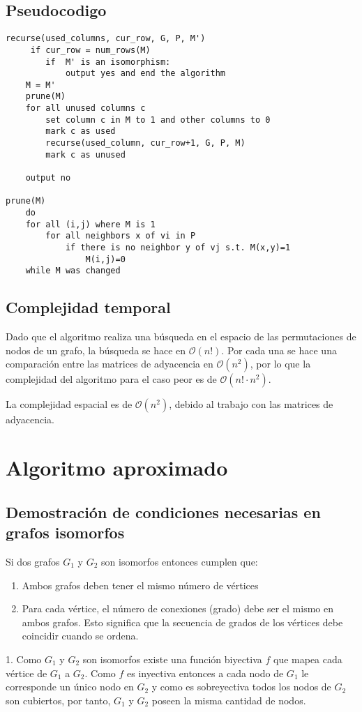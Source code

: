 \documentclass[12pt,a4paper]{article}
\begin{document}
\subsection{Pseudocodigo}
\begin{verbatim}
recurse(used_columns, cur_row, G, P, M')
     if cur_row = num_rows(M)
        if  M' is an isomorphism:
            output yes and end the algorithm
    M = M'
    prune(M) 
    for all unused columns c
        set column c in M to 1 and other columns to 0
        mark c as used
        recurse(used_column, cur_row+1, G, P, M)
        mark c as unused

    output no

prune(M)
    do
    for all (i,j) where M is 1
        for all neighbors x of vi in P
            if there is no neighbor y of vj s.t. M(x,y)=1
                M(i,j)=0
    while M was changed
\end{verbatim}
\subsection{Complejidad temporal}

Dado que el algoritmo realiza una búsqueda en el espacio de las permutaciones de nodos de un grafo, la búsqueda se hace en $\mathcal{O}(n!)$. Por cada una se hace una comparación entre las matrices de adyacencia en $\mathcal{O}(n^2)$, por lo que la complejidad del algoritmo para el caso peor es de $\mathcal{O}(n! \cdot n^2)$.

La complejidad espacial es de $\mathcal{O}(n^2)$, debido al trabajo con las matrices de adyacencia.

\section{Algoritmo aproximado}
\subsection{ Demostración de condiciones necesarias en grafos isomorfos}

Si dos grafos $G_1$ y $G_2$ son isomorfos entonces cumplen que:

\begin{enumerate}
\item Ambos grafos deben tener el mismo número de vértices
\item Para cada vértice, el número de conexiones (grado) debe ser el mismo en ambos grafos. Esto significa que la secuencia de grados de los vértices debe coincidir cuando se ordena.

\end{enumerate}
1. Como $G_1$ y $G_2$ son isomorfos existe una función biyectiva $f$ que mapea cada vértice de $G_1$ a $G_2$. Como $f$ es inyectiva entonces a cada nodo de $G_1$ le corresponde un único nodo en $G_2$ y como es sobreyectiva todos los nodos de $G_2$ son cubiertos, por tanto, $G_1$ y $G_2$ poseen la misma cantidad de nodos.
\end{document}
